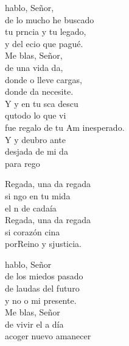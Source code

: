 \begin{cancion}[Regalada][Ixcís]%
	 hablo,	Señor,\\
	de lo mucho he buscado\\
	tu prncia y tu	legado,\\
	y del ecio	que	pagué.\\
	\jump
	Me blas,	Señor,\\
	de una vida da,\\
	donde o lleve	cargas,	\\
	donde da	necesite.\\
	\jump
	Y y en tu sca descu\\
	qutodo lo que vi \\
	fue regalo de tu Am inesperado.\\
	\jump
	Y y deubro ante\\
	desjada de mi da\\
	para  rego\jump\\
	\begin{chorus}%
		Regada, una da regada\\
		si ngo en tu mida \\
		el n de cadaía\\
		Regada, una da regada\\
		si  corazón cina \\
		porReino y sjusticia.\jump\\
	\end{chorus}%
	 hablo, Señor\\
	de los miedos pasado\\
	de laudas del futuro\\
	y no o mi presente.\\
	\jump
	Me blas, Señor\\
	de vivir el  a día\\
	acoger nuevo amanecer\\

\end{cancion}
